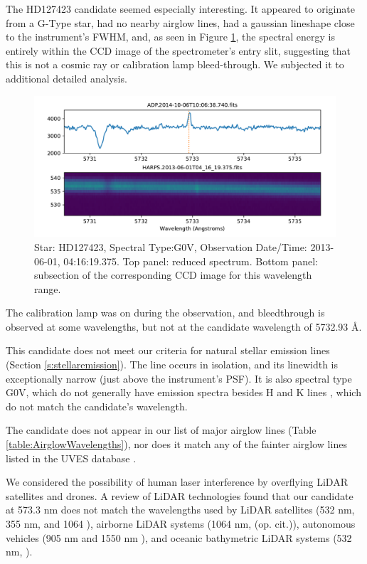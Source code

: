 \documentclass[twocolumn]{aastex701}
\begin{document}
The HD127423 candidate seemed especially interesting.  It appeared to originate from a G-Type star, had no nearby airglow lines, had a gaussian lineshape close to the instrument's FWHM, and, as seen in Figure \ref{fig:seti_candidate_HD127423}, the spectral energy is entirely within the CCD image of the spectrometer's entry slit, suggesting that this is not a cosmic ray or calibration lamp bleed-through.  We subjected it to additional detailed analysis.

\begin{figure}
    \centering  \includegraphics[width=\textwidth]{clean-figures/seti_candidate_HD127423.pdf}
    \caption{Star: HD127423, Spectral Type:G0V, Observation Date/Time: 2013-06-01, 04:16:19.375. Top panel: reduced spectrum.  Bottom panel: subsection of the corresponding CCD image for this wavelength range.}
    \label{fig:seti_candidate_HD127423}
\end{figure}

The calibration lamp was on during the observation, and bleedthrough is observed at some wavelengths, but not at the candidate wavelength of 5732.93 \AA.

This candidate does not meet our criteria for natural stellar emission lines (Section \ref{s:stellaremission}).  The line occurs in isolation, and its linewidth is exceptionally narrow (just above the instrument's PSF). It is also spectral type G0V, which do not generally have emission spectra besides H and K lines \citep{HandKemissionlines}, which do not match the candidate's wavelength. 

The candidate does not appear in our list of major airglow lines (Table \ref{table:AirglowWavelengths}), nor does it match any of the fainter airglow lines listed in the UVES database \citep{faint_airglow_database} \citep{UVES_database}. 

We considered the possibility of human laser interference by overflying LiDAR satellites and drones.  A review of LiDAR technologies found that our candidate at 573.3 nm does not match the wavelengths used by LiDAR satellites (532 nm, 355 nm, and 1064 \citep{lidar_history}), airborne LiDAR systems (1064 nm, (op. cit.)), autonomous vehicles (905 nm and 1550 nm \citep{vehicle_lidar}), and oceanic bathymetric LiDAR systems (532 nm, \citep{bathymetric_lidar}). 
\end{document}
